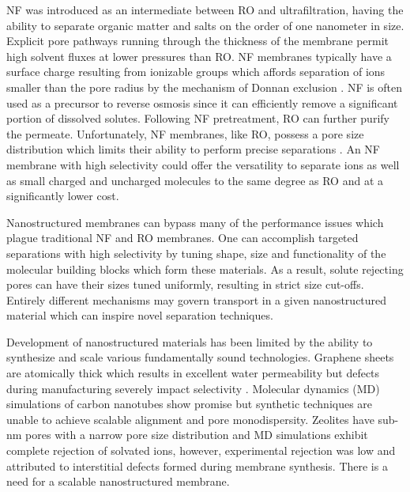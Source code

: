 \documentclass{article}
\begin{document}

  NF was introduced as an intermediate between RO and ultrafiltration, having
  the ability to separate organic matter and salts on the order of one nanometer
  in size. Explicit pore pathways running through the thickness of the membrane
  permit high solvent fluxes at lower pressures than RO. NF membranes typically
  have a surface charge resulting from ionizable groups which affords separation
  of ions smaller than the pore radius by the mechanism of Donnan exclusion
  \cite{van_der_bruggen_review_2003}. NF is often used as a precursor to reverse
  osmosis since it can efficiently remove a significant portion of dissolved
  solutes. Following NF pretreatment, RO can further purify the permeate. 
  Unfortunately, NF membranes, like RO, possess a pore size
  distribution which limits their ability to perform precise separations
  \cite{bowen_modelling_2002}. An NF membrane with high selectivity could offer
  the versatility to separate ions as well as small charged and uncharged
  molecules to the same degree as RO and at a significantly lower cost.

  Nanostructured membranes can bypass many of the performance issues which
  plague traditional NF and RO membranes. One can accomplish targeted separations
  with high selectivity by tuning shape, size and functionality of the molecular
  building blocks which form these materials. As a result, solute rejecting pores
  can have their sizes tuned uniformly, resulting in strict size cut-offs.
  Entirely different mechanisms may govern transport in a given nanostructured
  material which can inspire novel separation techniques.

  Development of nanostructured materials has been limited by the ability to
  synthesize and scale various fundamentally sound technologies. Graphene sheets
  are atomically thick which results in excellent water permeability but defects
  during manufacturing severely impact selectivity
  \cite{cohen-tanugi_multilayer_2016}. Molecular dynamics (MD) simulations of carbon
  nanotubes show promise \cite{humplik_nanostructured_2011} but synthetic
  techniques are unable to achieve scalable alignment and pore monodispersity.
  \cite{hata_water-assisted_2004,maruyama_growth_2005} Zeolites have sub-nm pores
  with a narrow pore size distribution and MD simulations exhibit complete
  rejection of solvated ions, \cite{murad_molecular_1998} however, experimental
  rejection was low and attributed to interstitial defects formed during membrane
  synthesis. \cite{li_desalination_2004} There is a need for a scalable
  nanostructured membrane. 
\end{document}
